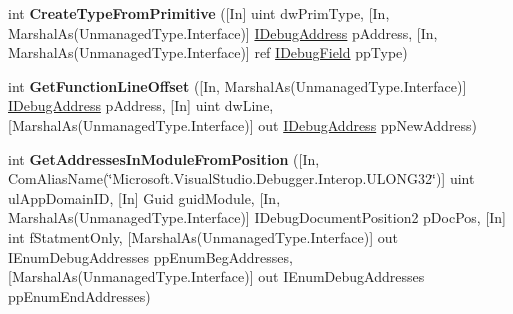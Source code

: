 \begin{DoxyCompactItemize}
\item 
\hypertarget{interface_microsoft_1_1_visual_studio_1_1_debugger_1_1_interop_e_e_1_1_i_debug_com_plus_symbol_provider_a256573f792d8b589c4c85974951d77dc}{int {\bfseries Create\+Type\+From\+Primitive} (\mbox{[}In\mbox{]} uint dw\+Prim\+Type, \mbox{[}In, Marshal\+As(Unmanaged\+Type.\+Interface)\mbox{]} \hyperlink{interface_microsoft_1_1_visual_studio_1_1_debugger_1_1_interop_e_e_1_1_i_debug_address}{I\+Debug\+Address} p\+Address, \mbox{[}In, Marshal\+As(Unmanaged\+Type.\+Interface)\mbox{]} ref \hyperlink{interface_microsoft_1_1_visual_studio_1_1_debugger_1_1_interop_e_e_1_1_i_debug_field}{I\+Debug\+Field} pp\+Type)}\label{interface_microsoft_1_1_visual_studio_1_1_debugger_1_1_interop_e_e_1_1_i_debug_com_plus_symbol_provider_a256573f792d8b589c4c85974951d77dc}

\item 
\hypertarget{interface_microsoft_1_1_visual_studio_1_1_debugger_1_1_interop_e_e_1_1_i_debug_com_plus_symbol_provider_aac5f5610ffa401a5f5a34c93c7ebb301}{int {\bfseries Get\+Function\+Line\+Offset} (\mbox{[}In, Marshal\+As(Unmanaged\+Type.\+Interface)\mbox{]} \hyperlink{interface_microsoft_1_1_visual_studio_1_1_debugger_1_1_interop_e_e_1_1_i_debug_address}{I\+Debug\+Address} p\+Address, \mbox{[}In\mbox{]} uint dw\+Line, \mbox{[}Marshal\+As(Unmanaged\+Type.\+Interface)\mbox{]} out \hyperlink{interface_microsoft_1_1_visual_studio_1_1_debugger_1_1_interop_e_e_1_1_i_debug_address}{I\+Debug\+Address} pp\+New\+Address)}\label{interface_microsoft_1_1_visual_studio_1_1_debugger_1_1_interop_e_e_1_1_i_debug_com_plus_symbol_provider_aac5f5610ffa401a5f5a34c93c7ebb301}

\item 
\hypertarget{interface_microsoft_1_1_visual_studio_1_1_debugger_1_1_interop_e_e_1_1_i_debug_com_plus_symbol_provider_ac875a0fb31831e7d03cf6769fcd36f5e}{int {\bfseries Get\+Addresses\+In\+Module\+From\+Position} (\mbox{[}In, Com\+Alias\+Name(\char`\"{}Microsoft.\+Visual\+Studio.\+Debugger.\+Interop.\+U\+L\+O\+N\+G32\char`\"{})\mbox{]} uint ul\+App\+Domain\+I\+D, \mbox{[}In\mbox{]} Guid guid\+Module, \mbox{[}In, Marshal\+As(Unmanaged\+Type.\+Interface)\mbox{]} I\+Debug\+Document\+Position2 p\+Doc\+Pos, \mbox{[}In\mbox{]} int f\+Statment\+Only, \mbox{[}Marshal\+As(Unmanaged\+Type.\+Interface)\mbox{]} out I\+Enum\+Debug\+Addresses pp\+Enum\+Beg\+Addresses, \mbox{[}Marshal\+As(Unmanaged\+Type.\+Interface)\mbox{]} out I\+Enum\+Debug\+Addresses pp\+Enum\+End\+Addresses)}\label{interface_microsoft_1_1_visual_studio_1_1_debugger_1_1_interop_e_e_1_1_i_debug_com_plus_symbol_provider_ac875a0fb31831e7d03cf6769fcd36f5e}


\end{DoxyCompactItemize}
